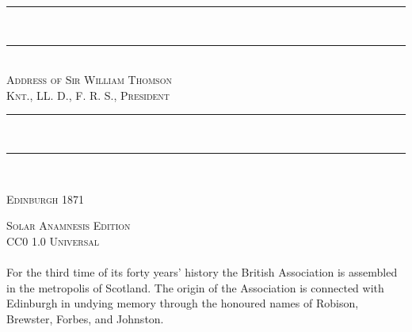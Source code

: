 \documentclass[a4paper, 11pt, oneside, english]{article}
\begin{document}
\begin{titlepage}
    \centering                     %

    \rule{\textwidth}{1.6pt}\\[-\baselineskip]\vskip2pt
    \rule{\textwidth}{0.4pt}\\[1\baselineskip]

    {\scshape\Huge Address of Sir William Thomson\\\normalsize Knt., LL. D., F. R. S., President}\\[1\baselineskip]

    \rule{\textwidth}{0.4pt}\\[-\baselineskip]\vskip3.2pt
    \rule{\textwidth}{1.6pt}\\[1\baselineskip]

    




    \vfill

    {\scshape Edinburgh 1871}

    {\scshape Solar Anamnesis Edition}\\[0.2\baselineskip]
    {\scshape\small CC0 1.0 Universal}
\end{titlepage}
\setlength{\parskip}{1mm plus1mm minus1mm}
\clearpage
\paragraph{}
For the third time of its forty years' history the British Association is assembled in the metropolis of Scotland. The origin of the Association is connected with Edinburgh in undying memory through the honoured names of Robison, Brewster, Forbes, and Johnston.
\end{document}
